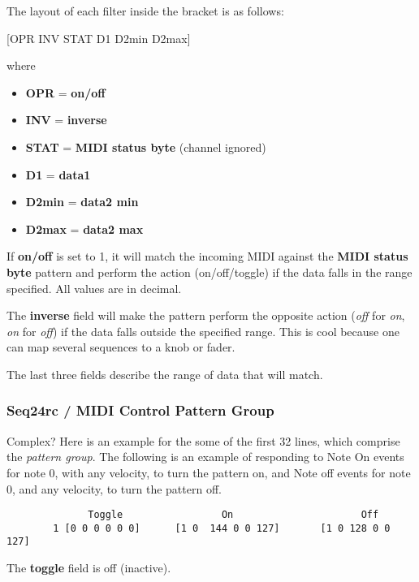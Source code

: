    The layout of each filter inside the bracket is as follows:

      [OPR INV STAT D1 D2min D2max]

   where

   \begin{itemize}
      \item \textbf{OPR} = \textbf{on/off}
      \item \textbf{INV} = \textbf{inverse}
      \item \textbf{STAT} = \textbf{MIDI status byte} (channel ignored) 
      \item \textbf{D1} = \textbf{data1}
      \item \textbf{D2min} = \textbf{data2 min}
      \item \textbf{D2max} = \textbf{data2 max}
   \end{itemize}

   If \textbf{on/off} is set to 1, it will match the incoming MIDI against
   the \textbf{MIDI status byte} pattern and perform the action
   (on/off/toggle) if the data falls in the range specified.  All values are
   in decimal.

	The \textbf{inverse} field will make the pattern perform the opposite 
   action (\textsl{off} for \textsl{on}, \textsl{on} for \textsl{off}) if
   the data falls outside the specified range.  This is cool because one can
   map several sequences to a knob or fader.

	The last three fields describe the range of data that will match.

\subsubsection{Seq24rc / MIDI Control Pattern Group}
\label{subsubsec:seq24_rc_file_midi_control_pattern_group}

   Complex?  Here is an example for the some of the first 32 lines, which
   comprise the \textsl{pattern group}.
   The following is an example of responding
   to Note On events for note 0, with any velocity, to turn the pattern on,
   and Note off events for note 0, and any velocity, to turn the pattern
   off.

   \begin{verbatim}
	          Toggle                 On                      Off
        1 [0 0 0 0 0 0]      [1 0  144 0 0 127]       [1 0 128 0 0 127]
   \end{verbatim}

   The \textbf{toggle} field is off (inactive).

